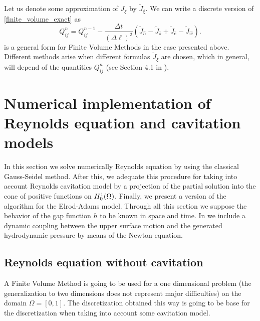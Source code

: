 Let us denote some approximation of $J_\xi$ by $\tilde{J}_\xi$. We can write a discrete version of \eqref{finite_volume_exact} as
\begin{equation}
Q_{ij}^{n}=Q_{ij}^{n-1}-\frac{\Delta t}{(\Delta \ell )^2} \left(\tilde{J}_{\hat{n}}-\tilde{J}_{\hat{s}}+\tilde{J}_{\hat{e}}-\tilde{J}_{\hat{w}}\right).\label{eq:finite_volume_app}
\end{equation}
 is a general form for Finite Volume Methods in the case presented above. Different methods arise when different formulas $\tilde{J}_{\xi}$ are chosen, which in general, will depend of the quantities $Q_{ij}^n$ (see Section 4.1 in \cite{leveque2002}).

\section{Numerical implementation of Reynolds equation and cavitation models}
\label{sec:num_impl_reyolds_cav_models}
In this section we solve numerically Reynolds equation by using the classical Gauss-Seidel method. After this, we adequate this procedure for taking into account Reynolds cavitation model by a projection of the partial solution into the cone of positive functions on ${H_0^1(\Omega)}$. Finally, we present a version of the algorithm for the Elrod-Adams model. Through all this section we suppose the behavior of the gap function $h$ to be known in space and time. In  we include a dynamic coupling between the upper surface motion and the generated hydrodynamic pressure by means of the Newton equation.
\subsection{Reynolds equation without cavitation}
A Finite Volume Method is going to be used for a one dimensional problem (the generalization to two dimensions does not represent major difficulties) on the domain $\Omega=[0,1]$. The discretization obtained this way is going to be base for the discretization when taking into account some cavitation model. 

